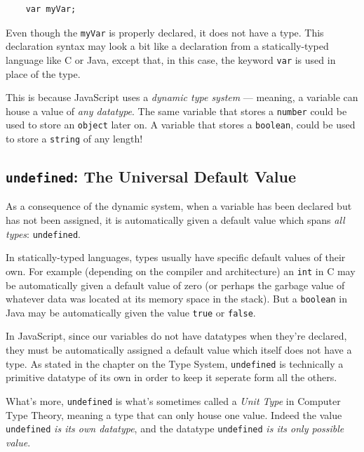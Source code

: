 \documentclass[11pt,letter]{book}
\begin{document}
    \begin{verbatim}
    var myVar;
    \end{verbatim}
    
    Even though the \texttt{myVar} is properly declared, it does not have a type. This declaration 
    syntax may look a bit like a declaration from a statically-typed language like C or Java, except
    that, in this case, the keyword \texttt{var} is used in place of the type.
    
    This is because JavaScript uses a \emph{dynamic type system} --- meaning, a variable can house a 
    value of \emph{any datatype}. The same variable that stores a \texttt{number} could be used to 
    store an \texttt{object} later on. A variable that stores a \texttt{boolean}, could be used to 
    store a \texttt{string} of any length!
    
    \subsection{\texttt{undefined}: The Universal Default Value}
    
    As a consequence of the dynamic system, when a variable has been declared but has not been 
    assigned, it is automatically given a default value which spans \emph{all types}: 
    \texttt{undefined}.
    
    In statically-typed languages, types usually have specific default values of their own. For 
    example (depending on the compiler and architecture) an \texttt{int} in C may be automatically
    given a default value of zero (or perhaps the garbage value of whatever data was located at its 
    memory space in the stack). But a \texttt{boolean} in Java may be automatically given the value 
    \texttt{true} or \texttt{false}.
    
    In JavaScript, since our variables do not have datatypes when they're declared, they must be 
    automatically assigned a default value which itself does not have a type. As stated in the 
    chapter on the Type System, \texttt{undefined} is technically a primitive datatype of its own
    in order to keep it seperate form all the others. 
    
    What's more, \texttt{undefined} is what's sometimes called a \emph{Unit Type} in Computer Type 
    Theory, meaning a type that can only house one value. Indeed the value \texttt{undefined} 
    \emph{is its own datatype}, and the datatype \texttt{undefined} \emph{is its only possible 
    value}.
    
\end{document}
